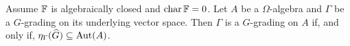 



\begin{prop}\label{prop:g-hat-Aut-A}
	Assume $\mathbb{F}$ is algebraically closed and $\operatorname{char} \mathbb{F} = 0$.
	Let $A$ be a $\Omega$-algebra and $\Gamma$ be a $G$-grading on its underlying vector space.
	Then $\Gamma$ is a $G$-grading on $A$ if, and only if, $\eta_\Gamma(\widehat G) \subseteq \operatorname{Aut}(A)$.
\end{prop}

